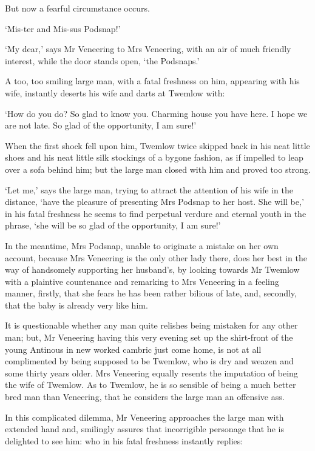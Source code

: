 But now a fearful circumstance occurs.

‘Mis-ter and Mis-sus Podsnap!’

‘My dear,’ says Mr Veneering to Mrs Veneering, with an air of much
friendly interest, while the door stands open, ‘the Podsnaps.’

A too, too smiling large man, with a fatal freshness on him, appearing
with his wife, instantly deserts his wife and darts at Twemlow with:

‘How do you do? So glad to know you. Charming house you have here. I
hope we are not late. So glad of the opportunity, I am sure!’

When the first shock fell upon him, Twemlow twice skipped back in
his neat little shoes and his neat little silk stockings of a bygone
fashion, as if impelled to leap over a sofa behind him; but the large
man closed with him and proved too strong.

‘Let me,’ says the large man, trying to attract the attention of his
wife in the distance, ‘have the pleasure of presenting Mrs Podsnap
to her host. She will be,’ in his fatal freshness he seems to find
perpetual verdure and eternal youth in the phrase, ‘she will be so glad
of the opportunity, I am sure!’

In the meantime, Mrs Podsnap, unable to originate a mistake on her own
account, because Mrs Veneering is the only other lady there, does her
best in the way of handsomely supporting her husband’s, by looking
towards Mr Twemlow with a plaintive countenance and remarking to Mrs
Veneering in a feeling manner, firstly, that she fears he has been
rather bilious of late, and, secondly, that the baby is already very
like him.

It is questionable whether any man quite relishes being mistaken for
any other man; but, Mr Veneering having this very evening set up the
shirt-front of the young Antinous in new worked cambric just come home,
is not at all complimented by being supposed to be Twemlow, who is dry
and weazen and some thirty years older. Mrs Veneering equally resents
the imputation of being the wife of Twemlow. As to Twemlow, he is
so sensible of being a much better bred man than Veneering, that he
considers the large man an offensive ass.

In this complicated dilemma, Mr Veneering approaches the large man with
extended hand and, smilingly assures that incorrigible personage that he
is delighted to see him: who in his fatal freshness instantly replies:

